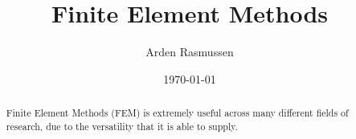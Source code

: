 \documentclass[10pt]{amsart}
\title{Finite Element Methods}
\author{Arden Rasmussen}
\date{\today}
\begin{document}
\maketitle

\begin{abstract}
  Finite Element Methods (FEM) is extremely useful across many different fields
  of research, due to the versatility that it is able to supply.
\end{abstract}

\begin{multicols}{2}


\end{multicols}
\end{document}
